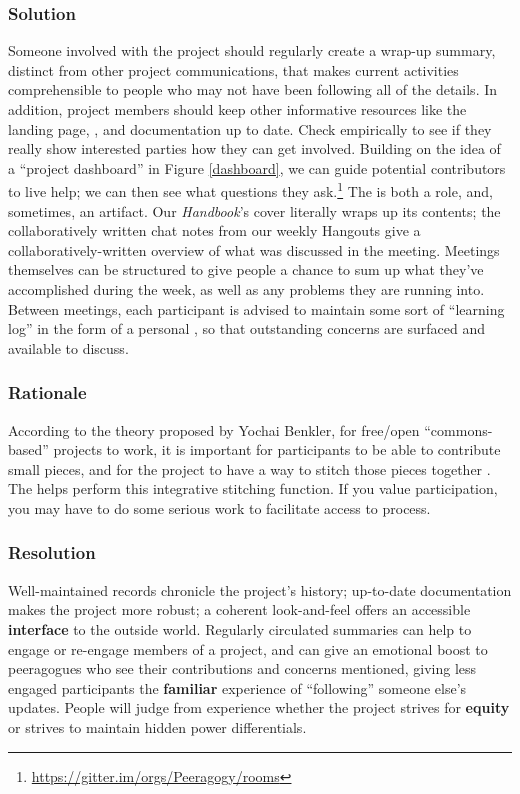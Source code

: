 \subsubsection*{Solution}
Someone involved with the project should regularly create a wrap-up
summary, distinct from other project communications, that makes
current activities comprehensible to people who may not have been
following all of the details.  In addition, project members should
keep other informative resources like the landing page,
, and documentation up to date.  Check
empirically to see if they really show interested parties how they can
get involved.  Building on the idea of a ``project
dashboard'' in Figure \ref{dashboard}, we can guide potential
contributors to live help; we can then see what questions they
ask.\footnote{\url{https://gitter.im/orgs/Peeragogy/rooms}}  The
 is both a role, and, sometimes, an artifact.
Our \emph{Handbook}'s cover literally wraps up its contents; the
collaboratively written chat notes from our weekly Hangouts give a
collaboratively-written overview of what was discussed in the meeting.
Meetings themselves can be structured to give people a chance to sum
up what they've accomplished during the week, as well as any problems
they are running into.  Between meetings, each participant is advised
to maintain some sort of ``learning log'' in the form of a personal
, so that outstanding concerns are surfaced and
available to discuss.

\subsubsection*{Rationale}
According to the theory proposed by Yochai Benkler, for free/open ``commons-based'' projects to work, it is important for participants to be able to contribute small pieces, and for the project to have a way to stitch those pieces together \cite{coases-penguin}. The  helps perform this integrative stitching function. If you value participation, you may have to do some serious work to facilitate access to process.

\subsubsection*{Resolution} 
Well-maintained records chronicle the project's history; up-to-date documentation makes the project more robust; a coherent look-and-feel offers an accessible \textbf{interface} to the outside world. Regularly circulated summaries can help to engage or re-engage members of a project, and can give an emotional boost to peeragogues who see their contributions and concerns mentioned, giving less engaged participants the \textbf{familiar} experience of ``following'' someone else's updates. People will judge from experience whether the project strives for \textbf{equity} or strives to maintain hidden power differentials.  

